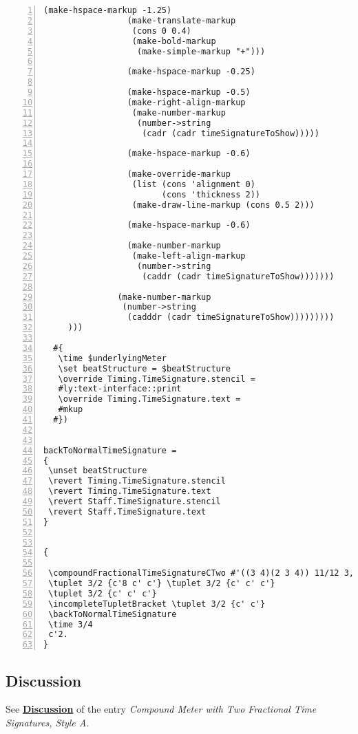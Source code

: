 \begin{Verbatim}[numbers=left,xleftmargin=5mm]
                 (make-hspace-markup -1.25)
                 (make-translate-markup
                  (cons 0 0.4)
                  (make-bold-markup
                   (make-simple-markup "+")))

                 (make-hspace-markup -0.25)

                 (make-hspace-markup -0.5)
                 (make-right-align-markup
                  (make-number-markup
                   (number->string
                    (cadr (cadr timeSignatureToShow)))))

                 (make-hspace-markup -0.6)

                 (make-override-markup
                  (list (cons 'alignment 0)
                        (cons 'thickness 2))
                  (make-draw-line-markup (cons 0.5 2)))

                 (make-hspace-markup -0.6)

                 (make-number-markup
                  (make-left-align-markup
                   (number->string
                    (caddr (cadr timeSignatureToShow)))))))

               (make-number-markup
                (number->string
                 (cadddr (cadr timeSignatureToShow)))))))))
     )))

  #{
   \time $underlyingMeter
   \set beatStructure = $beatStructure
   \override Timing.TimeSignature.stencil =
   #ly:text-interface::print
   \override Timing.TimeSignature.text =
   #mkup
  #})


backToNormalTimeSignature =
{
 \unset beatStructure
 \revert Timing.TimeSignature.stencil
 \revert Timing.TimeSignature.text
 \revert Staff.TimeSignature.stencil
 \revert Staff.TimeSignature.text
}


{

 \compoundFractionalTimeSignatureCTwo #'((3 4)(2 3 4)) 11/12 3,3,3,2
 \tuplet 3/2 {c'8 c' c'} \tuplet 3/2 {c' c' c'}
 \tuplet 3/2 {c' c' c'}
 \incompleteTupletBracket \tuplet 3/2 {c' c'}
 \backToNormalTimeSignature
 \time 3/4
 c'2.
}
\end{Verbatim}
\subsection{Discussion}
See \hyperref[sec:compoundfractionalmeter_discussion]{\textbf{Discussion}} of the entry \textit{Compound Meter with Two Fractional Time Signatures, Style A.} \par

